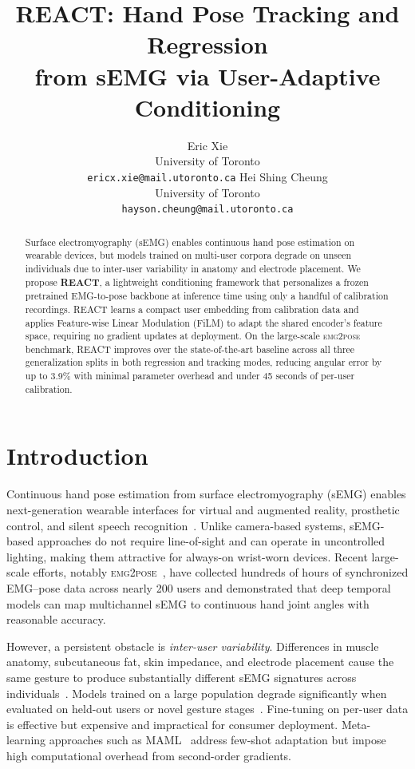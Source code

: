 \documentclass[10pt]{article}
\title{REACT: Hand Pose Tracking and Regression\\from sEMG via User-Adaptive Conditioning}
\author{%
  Eric Xie \\
  University of Toronto \\
  \texttt{ericx.xie@mail.utoronto.ca}
  \And
  Hei Shing Cheung \\
  University of Toronto \\
  \texttt{hayson.cheung@mail.utoronto.ca}
}
\begin{document}
\maketitle

\begin{abstract}
Surface electromyography (sEMG) enables continuous hand pose estimation on wearable devices, but models trained on multi-user corpora degrade on unseen individuals due to inter-user variability in anatomy and electrode placement. We propose \textbf{REACT}, a lightweight conditioning framework that personalizes a frozen pretrained EMG-to-pose backbone at inference time using only a handful of calibration recordings. REACT learns a compact user embedding from calibration data and applies Feature-wise Linear Modulation (FiLM) to adapt the shared encoder's feature space, requiring no gradient updates at deployment. On the large-scale \textsc{emg2pose} benchmark, REACT improves over the state-of-the-art baseline across all three generalization splits in both regression and tracking modes, reducing angular error by up to 3.9\% with minimal parameter overhead and under 45 seconds of per-user calibration.
\end{abstract}

\section{Introduction}
\label{sec:intro}

Continuous hand pose estimation from surface electromyography (sEMG) enables next-generation wearable interfaces for virtual and augmented reality, prosthetic control, and silent speech recognition~\citep{salter2024emg2pose, ctrlabs2024generic}. Unlike camera-based systems, sEMG-based approaches do not require line-of-sight and can operate in uncontrolled lighting, making them attractive for always-on wrist-worn devices. Recent large-scale efforts, notably \textsc{emg2pose}~\citep{salter2024emg2pose}, have collected hundreds of hours of synchronized EMG--pose data across nearly 200 users and demonstrated that deep temporal models can map multichannel sEMG to continuous hand joint angles with reasonable accuracy.

However, a persistent obstacle is \emph{inter-user variability}. Differences in muscle anatomy, subcutaneous fat, skin impedance, and electrode placement cause the same gesture to produce substantially different sEMG signatures across individuals~\citep{atzori2016electromyography, phinyomark2018feature}. Models trained on a large population degrade significantly when evaluated on held-out users or novel gesture stages~\citep{salter2024emg2pose}. Fine-tuning on per-user data is effective but expensive and impractical for consumer deployment. Meta-learning approaches such as MAML~\citep{finn2017maml} address few-shot adaptation but impose high computational overhead from second-order gradients.
\end{document}
